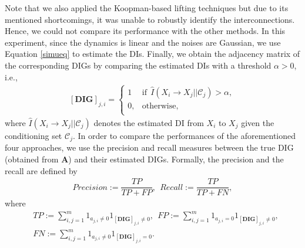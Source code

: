 Note that we also applied the Koopman-based lifting techniques but due to its mentioned shortcomings, it was unable to robustly identify the interconnections. 
Hence, we could not compare its performance with the other methods. 
In this experiment, since the dynamics is linear and the noises are Gaussian, we use Equation \eqref{simueq} to estimate the DIs. 
Finally, we obtain the adjacency matrix of the corresponding DIGs by comparing the estimated DIs with a threshold $\alpha>0$, i.e., 
\begin{align}\label{eq:m}
    [\textbf{DIG}]_{j,i}=\left\{
\begin{array}{ll}
      1  & \text{if}\ \ \widehat{I}(X_i\rightarrow X_j||\mathcal{C}_j)>\alpha, \\
      0,  & \text{otherwise}, \\
\end{array} 
\right.
\end{align}
where $\widehat{I}(X_i\rightarrow X_j||\mathcal{C}_j)$ denotes the estimated DI from $X_i$ to $X_j$ given the conditioning set $\mathcal{C}_j$. 
In order to compare the performances of the aforementioned four approaches, we use the precision and recall measures between the true DIG (obtained from $\textbf{A}$) and their estimated DIGs. 
Formally, the precision and the recall are defined by
\begin{align*}
    Precision:= \dfrac{TP}{TP+FP}, \ \ Recall:= \dfrac{TP}{TP+FN},
\end{align*}
where 
\begin{align*}
    & TP := \sum_{i,j=1}^m 1_{a_{j,i} \neq 0}1_{ [\textbf{DIG}]_{j,i} \neq 0}, \ \ FP := \sum_{i,j=1}^m 1_{a_{j,i} = 0}1_{ [\textbf{DIG}]_{j,i} \neq 0},\\
    & FN := \sum_{i,j=1}^m 1_{a_{j,i} \neq 0}1_{ [\textbf{DIG}]_{j,i} = 0}.
\end{align*}

